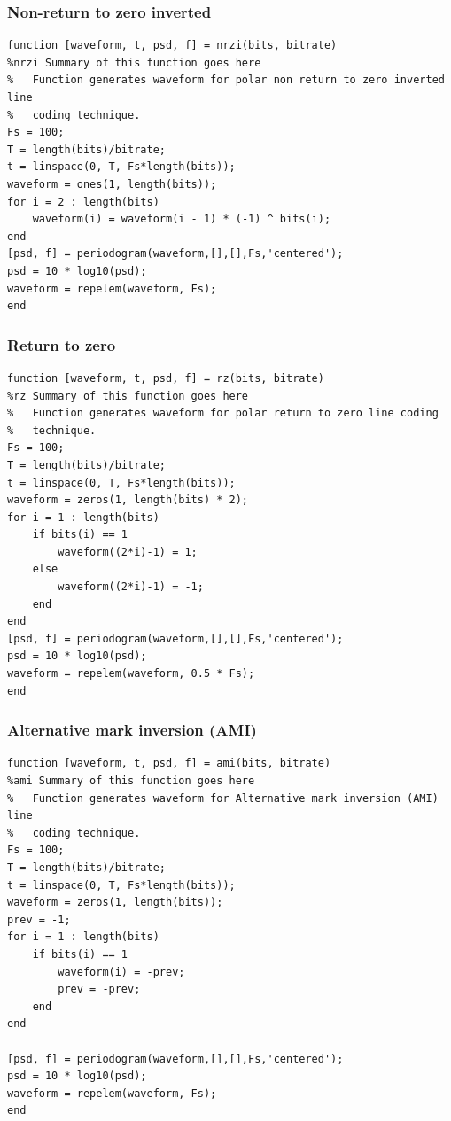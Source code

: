\documentclass[a4paper, 12pt, english]{article}
\begin{document}
\subsubsection{Non-return to zero inverted}
\begin{lstlisting}[style=matlab]
function [waveform, t, psd, f] = nrzi(bits, bitrate)
%nrzi Summary of this function goes here
%   Function generates waveform for polar non return to zero inverted line 
%   coding technique.
Fs = 100;
T = length(bits)/bitrate;
t = linspace(0, T, Fs*length(bits));
waveform = ones(1, length(bits));
for i = 2 : length(bits)
    waveform(i) = waveform(i - 1) * (-1) ^ bits(i);
end
[psd, f] = periodogram(waveform,[],[],Fs,'centered');
psd = 10 * log10(psd);
waveform = repelem(waveform, Fs);
end
\end{lstlisting}

\subsubsection{Return to zero}
\begin{lstlisting}[style=matlab]
function [waveform, t, psd, f] = rz(bits, bitrate)
%rz Summary of this function goes here
%   Function generates waveform for polar return to zero line coding
%   technique.
Fs = 100;
T = length(bits)/bitrate;
t = linspace(0, T, Fs*length(bits));
waveform = zeros(1, length(bits) * 2);
for i = 1 : length(bits)
    if bits(i) == 1
        waveform((2*i)-1) = 1;
    else
        waveform((2*i)-1) = -1;
    end
end
[psd, f] = periodogram(waveform,[],[],Fs,'centered');
psd = 10 * log10(psd);
waveform = repelem(waveform, 0.5 * Fs);
end
\end{lstlisting}

\subsubsection{Alternative mark inversion (AMI)}
\begin{lstlisting}[style=matlab]
function [waveform, t, psd, f] = ami(bits, bitrate)
%ami Summary of this function goes here
%   Function generates waveform for Alternative mark inversion (AMI) line 
%   coding technique.
Fs = 100;
T = length(bits)/bitrate;
t = linspace(0, T, Fs*length(bits));
waveform = zeros(1, length(bits));
prev = -1;
for i = 1 : length(bits)
    if bits(i) == 1
        waveform(i) = -prev;
        prev = -prev;
    end
end

[psd, f] = periodogram(waveform,[],[],Fs,'centered');
psd = 10 * log10(psd);
waveform = repelem(waveform, Fs);
end
\end{lstlisting}
\end{document}
